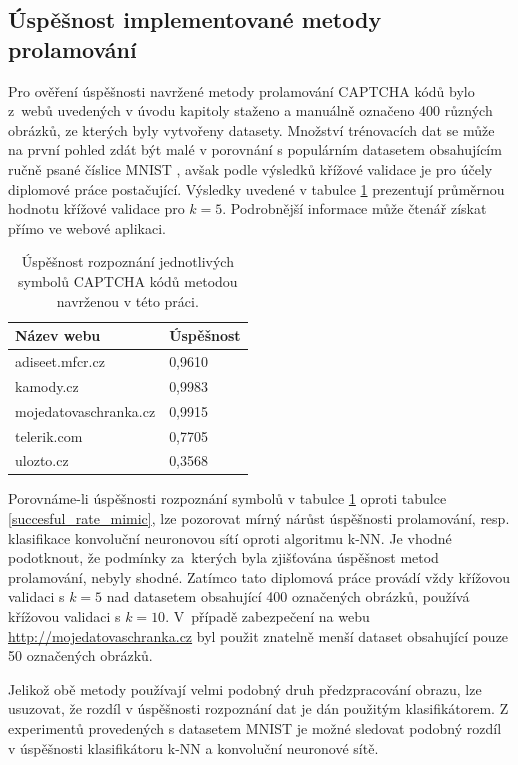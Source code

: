 \documentclass[
  field=ainfp,
  master=true,
  biblatex,
  sourcecodes=false,
  theorems=false,
  glossaries,
  index
]{kidiplom}
\begin{document}
\subsection{Úspěšnost implementované metody prolamování}
Pro ověření úspěšnosti navržené metody prolamování CAPTCHA kódů bylo z~webů uvedených v úvodu kapitoly staženo a manuálně označeno 400 různých obrázků, ze kterých byly vytvořeny datasety. Množství trénovacích dat se může na první pohled zdát být malé v porovnání s populárním datasetem obsahujícím ručně psané číslice MNIST \citep{mnist}, avšak podle výsledků křížové validace je pro účely diplomové práce postačující. Výsledky uvedené v tabulce \ref{succesful_rate_mine} prezentují průměrnou hodnotu křížové validace pro $k=5$. Podrobnější informace může čtenář získat přímo ve webové aplikaci.

\begin{table}[H]
\centering
\begin{tabular}{|l|l|}
\hline
\textbf{Název webu} & \textbf{Úspěšnost}
\\ \hline
adiseet.mfcr.cz & 0,9610
\\ \hline
kamody.cz & 0,9983
\\ \hline
mojedatovaschranka.cz & 0,9915
\\ \hline
telerik.com & 0,7705
\\ \hline
ulozto.cz & 0,3568
\\ \hline
\end{tabular}
\caption{Úspěšnost rozpoznání jednotlivých symbolů CAPTCHA kódů metodou navrženou v této práci.}
\label{succesful_rate_mine}
\end{table}

Porovnáme-li úspěšnosti rozpoznání symbolů v tabulce \ref{succesful_rate_mine} oproti tabulce \ref{succesful_rate_mimic}, lze pozorovat mírný nárůst úspěšnosti prolamování, resp. klasifikace konvoluční neuronovou sítí oproti algoritmu k-NN. Je vhodné podotknout, že podmínky za~kterých byla zjišťována úspěšnost metod prolamování, nebyly shodné. Zatímco tato diplomová práce provádí vždy křížovou validaci s $k=5$ nad datasetem obsahující 400 označených obrázků, \citep{Kopp2016HowTM} používá křížovou validaci s $k=10$. V~případě zabezpečení na webu \url{http://mojedatovaschranka.cz} byl použit znatelně menší dataset obsahující pouze 50 označených obrázků. 

Jelikož obě metody používají velmi podobný druh předzpracování obrazu, lze usuzovat, že rozdíl v úspěšnosti rozpoznání dat je dán použitým klasifikátorem. Z experimentů provedených s datasetem MNIST \citep{mnist} je možné sledovat podobný rozdíl v úspěšnosti klasifikátoru k-NN a konvoluční neuronové sítě.
\end{document}
